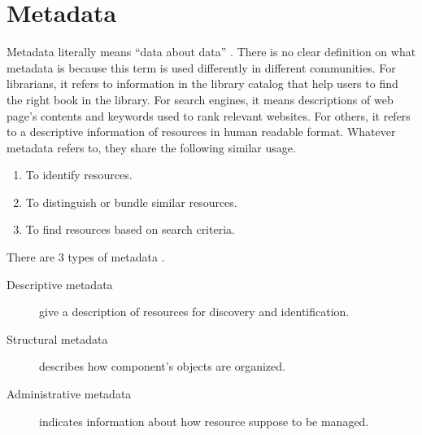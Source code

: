 \section{Metadata}
Metadata literally means \enquote{data about data} \cite[p.~1]{baca_2008}.
There is no clear definition on what metadata is because this term is used differently in different communities.
For librarians, it refers to information in the library catalog that help users to find the right book in the library.
For search engines, it means descriptions of web page's contents and keywords used to rank relevant websites.
For others, it refers to a descriptive information of resources in human readable format.
Whatever metadata refers to, they share the following similar usage.
\begin{enumerate}
	\item To identify resources.
	\item To distinguish or bundle similar resources.
	\item To find resources based on search criteria.
\end{enumerate}
There are 3 types of metadata \cite{hodge_2001}.
\begin{description}
	\item[Descriptive metadata] give a description of resources for discovery and identification.
	\item[Structural metadata] describes how component's objects are organized.
	\item[Administrative metadata] indicates information about how resource suppose to be managed.
\end{description}

